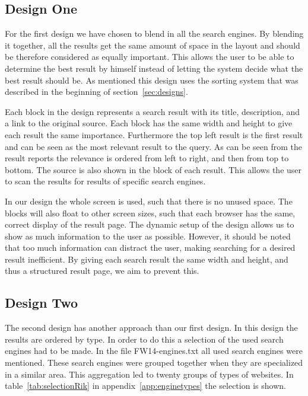 \documentclass[12pt]{article}
\begin{document}
\subsection{Design One}
\label{sec:layoutHan}
For the first design we have chosen to blend in all the search engines.
By blending it together, all the results get the same amount of space in the layout and should be therefore considered as equally important. 
This allows the user to be able to determine the best result by himself instead of letting the system decide what the best result should be.
As mentioned this design uses the sorting system that was described in the beginning of section~\ref{sec:designs}.

Each block in the design represents a search result with its title, description, and a link to the original source. 
Each block has the same width and height to give each result the same importance. 
Furthermore the top left result is the first result and can be seen as the most relevant result to the query.
As can be seen from the result reports the relevance is ordered from left to right, and then from top to bottom. 
The source is also shown in the block of each result.
This allows the user to scan the results for results of specific search engines. 

In our design the whole screen is used, such that there is no unused space. 
The blocks will also float to other screen sizes, such that each browser has the same, correct display of the result page.
The dynamic setup of the design allows us to show as much information to the user as possible. 
However, it should be noted that too much information can distract the user, making searching for a desired result inefficient.
By giving each search result the same width and height, and thus a structured result page, we aim to prevent this. 

\subsection{Design Two}
\label{sec:layoutRik}
The second design has another approach than our first design.
In this design the results are ordered by type.
In order to do this a selection of the used search engines had to be made.
In the file FW14-engines.txt all used search engines were mentioned.
These search engines were grouped together when they are specialized in a similar area.
This aggregation led to twenty groups of types of websites.
In table~\ref{tab:selectionRik} in appendix~\ref{app:enginetypes} the selection is shown.
\end{document}
